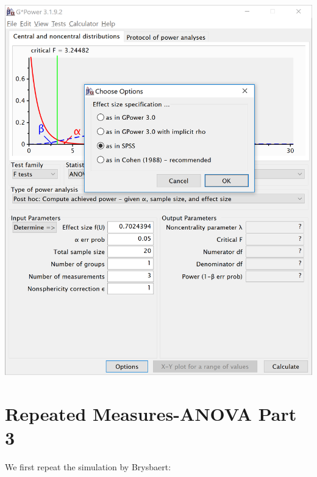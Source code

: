 \documentclass[]{book}
\begin{document}
\includegraphics{screenshots/gpower_14.png}

\hypertarget{repeated-measures-anova-part-3}{%
\section{Repeated Measures-ANOVA Part 3}\label{repeated-measures-anova-part-3}}

We first repeat the simulation by Brysbaert:
\end{document}
